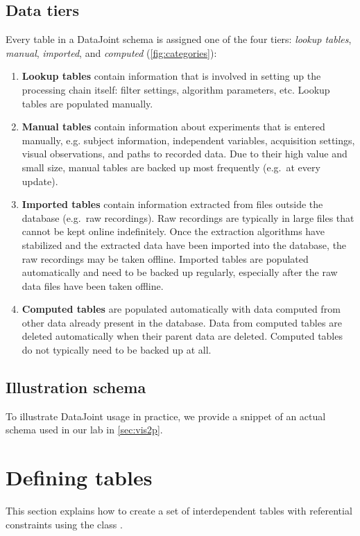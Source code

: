 \documentclass[10pt]{article}
\begin{document}
\subsection{Data tiers}\label{sec:tiers}
Every table in a DataJoint schema is assigned one of the four tiers: {\em lookup tables}, {\em manual}, {\em imported}, and {\em computed}  (\autoref{fig:categories}):
\begin{enumerate}
   \item{\bf Lookup tables} contain information that is involved in setting up the processing chain itself: filter settings, algorithm parameters, etc.  Lookup tables are populated manually.
   \item{\bf Manual tables} contain information about experiments that is entered manually, e.g. subject information, independent variables, acquisition settings, visual observations, and paths to recorded data.  Due to their high value and small size, manual tables are backed up most frequently (e.g.~at every update).
   \item{\bf Imported tables} contain information extracted from  files outside the database (e.g.~raw recordings).  Raw recordings are typically in large files that cannot be kept online indefinitely. Once the extraction algorithms have stabilized and the extracted  data have been imported into the database, the raw recordings may be taken offline.  Imported tables are populated automatically and need to be backed up regularly, especially after the raw data files have been taken offline. 
   \item {\bf Computed tables} are populated automatically with data computed from other data already present in the database.  Data from computed tables are deleted automatically when their parent data are deleted. Computed tables do not typically need to be backed up at all.
\end{enumerate}  


\subsection{Illustration schema}
To illustrate DataJoint usage in practice, we provide a snippet of an actual schema used in our lab in \autoref{sec:vis2p}.


\section{Defining tables}\label{sec:definition}

This section explains how to create a set of interdependent tables with referential constraints using the class .
\end{document}
